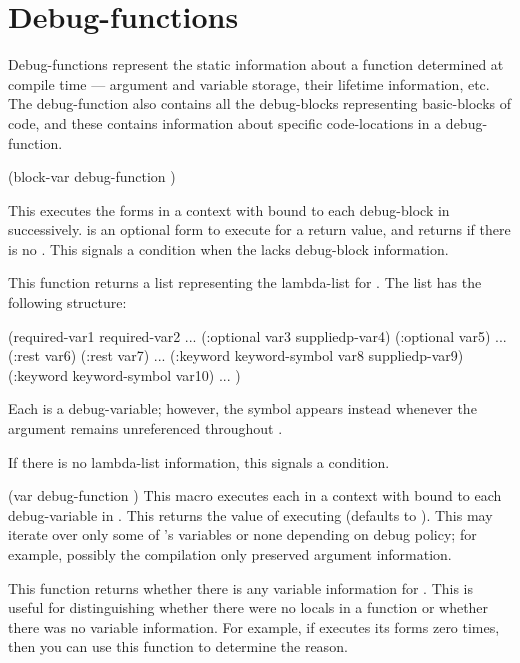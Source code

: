 {\section {Debug-functions}

Debug-functions represent the static information about a function determined at
compile time --- argument and variable storage, their lifetime information,
etc.  The debug-function also contains all the debug-blocks representing
basic-blocks of code, and these contains information about specific
code-locations in a debug-function.

  {(block-var debug-function ) }

This executes the forms in a context with  bound to each
debug-block in  successively.   is
an optional form to execute for a return value, and
 returns \nil if there is no
.  This signals a  condition when the
 lacks debug-block information.
\enddefmac


This function returns a list representing the lambda-list for 
.  The list has the following structure:
\begin{example}
   (required-var1 required-var2
    ...
    (:optional var3 suppliedp-var4)
    (:optional var5)
    ...
    (:rest var6) (:rest var7)
    ...
    (:keyword keyword-symbol var8 suppliedp-var9)
    (:keyword keyword-symbol var10)
    ...
    )
\end{example}
Each  is a debug-variable; however, the symbol
 appears instead whenever the argument remains unreferenced
throughout .

If there is no lambda-list information, this signals a
 condition.
\enddefun


  {(var debug-function ) }
This macro executes each  in a context with  bound to each
debug-variable in .  This returns the value of executing
 (defaults to \nil).  This may iterate over only some of 
's variables or none depending on debug policy; for example,
possibly the compilation only preserved argument information.
\enddefmac


This function returns whether there is any variable information for 
.  This is useful for distinguishing whether there were no
locals in a function or whether there was no variable information.  For
example, if  executes its forms zero times,
then you can use this function to determine the reason.
\enddefun


}
